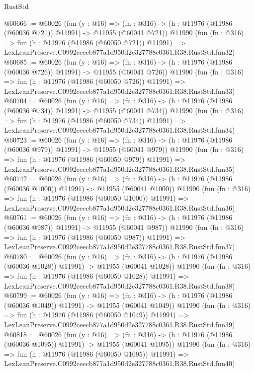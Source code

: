 \begin{lexlean}{RustStd}
\begin{coremodule}
@60666 := @60026
    (fun (y : @16) =>
    (fn : @316) -> (h : @11976 (@11986 (@60036 @721)) @11991) -> @11955 (@60041 @721))
    @11990
    (fun (fn : @316) =>
    fun (h : @11976 (@11986 (@60050 @721)) @11991) =>
    LexLeanPreserve.C0992ceecb877a1d950d2e327788c0361.R38.RustStd.fun32)
@60685 := @60026
    (fun (y : @16) =>
    (fn : @316) -> (h : @11976 (@11986 (@60036 @726)) @11991) -> @11955 (@60041 @726))
    @11990
    (fun (fn : @316) =>
    fun (h : @11976 (@11986 (@60050 @726)) @11991) =>
    LexLeanPreserve.C0992ceecb877a1d950d2e327788c0361.R38.RustStd.fun33)
@60704 := @60026
    (fun (y : @16) =>
    (fn : @316) -> (h : @11976 (@11986 (@60036 @734)) @11991) -> @11955 (@60041 @734))
    @11990
    (fun (fn : @316) =>
    fun (h : @11976 (@11986 (@60050 @734)) @11991) =>
    LexLeanPreserve.C0992ceecb877a1d950d2e327788c0361.R38.RustStd.fun34)
@60723 := @60026
    (fun (y : @16) =>
    (fn : @316) -> (h : @11976 (@11986 (@60036 @979)) @11991) -> @11955 (@60041 @979))
    @11990
    (fun (fn : @316) =>
    fun (h : @11976 (@11986 (@60050 @979)) @11991) =>
    LexLeanPreserve.C0992ceecb877a1d950d2e327788c0361.R38.RustStd.fun35)
@60742 := @60026
    (fun (y : @16) =>
    (fn : @316) -> (h : @11976 (@11986 (@60036 @1000)) @11991) -> @11955 (@60041 @1000))
    @11990
    (fun (fn : @316) =>
    fun (h : @11976 (@11986 (@60050 @1000)) @11991) =>
    LexLeanPreserve.C0992ceecb877a1d950d2e327788c0361.R38.RustStd.fun36)
@60761 := @60026
    (fun (y : @16) =>
    (fn : @316) -> (h : @11976 (@11986 (@60036 @987)) @11991) -> @11955 (@60041 @987))
    @11990
    (fun (fn : @316) =>
    fun (h : @11976 (@11986 (@60050 @987)) @11991) =>
    LexLeanPreserve.C0992ceecb877a1d950d2e327788c0361.R38.RustStd.fun37)
@60780 := @60026
    (fun (y : @16) =>
    (fn : @316) -> (h : @11976 (@11986 (@60036 @1028)) @11991) -> @11955 (@60041 @1028))
    @11990
    (fun (fn : @316) =>
    fun (h : @11976 (@11986 (@60050 @1028)) @11991) =>
    LexLeanPreserve.C0992ceecb877a1d950d2e327788c0361.R38.RustStd.fun38)
@60799 := @60026
    (fun (y : @16) =>
    (fn : @316) -> (h : @11976 (@11986 (@60036 @1049)) @11991) -> @11955 (@60041 @1049))
    @11990
    (fun (fn : @316) =>
    fun (h : @11976 (@11986 (@60050 @1049)) @11991) =>
    LexLeanPreserve.C0992ceecb877a1d950d2e327788c0361.R38.RustStd.fun39)
@60818 := @60026
    (fun (y : @16) =>
    (fn : @316) -> (h : @11976 (@11986 (@60036 @1095)) @11991) -> @11955 (@60041 @1095))
    @11990
    (fun (fn : @316) =>
    fun (h : @11976 (@11986 (@60050 @1095)) @11991) =>
    LexLeanPreserve.C0992ceecb877a1d950d2e327788c0361.R38.RustStd.fun40)

\end{coremodule}
\end{lexlean}
